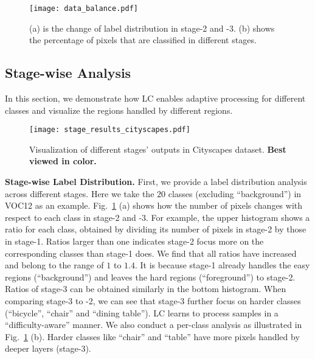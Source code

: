 \documentclass[10pt,twocolumn,letterpaper]{article}
\begin{document}
\begin{figure}
    \centering
    \texttt{[image: data\_balance.pdf]}
    \vskip -0.2cm
    \caption{\small{(a) is the change of label distribution in stage-2 and -3. (b) shows the percentage of pixels that are classified in different stages.}}
    \label{fig:data_balance}
    \vspace{-12pt}
\end{figure}

\subsection{Stage-wise Analysis}
\label{subsec:stage_analysis}

In this section, we demonstrate how LC enables adaptive processing for different classes and visualize the regions handled by different regions. 

\begin{figure*}
    \centering
    \texttt{[image: stage\_results\_cityscapes.pdf]}
    \vskip -0.2cm
    \caption{\small{Visualization of different stages' outputs in Cityscapes dataset. \textbf{Best viewed in color.}}}
    \label{fig:stage_results_cityscapes}
\end{figure*}

\noindent
\textbf{Stage-wise Label Distribution.}
First, we provide a label distribution analysis across different stages. 
Here we take the $20$ classes (excluding ``background'') in VOC12 as an example.
Fig.~\ref{fig:data_balance} (a) shows how the number of pixels changes with respect to each class in stage-2 and -3. For example, the upper histogram shows a ratio for each class, obtained by dividing its number of pixels in stage-2 by those in stage-1. Ratios larger than one indicates stage-2 focus more on the corresponding classes than stage-1 does. 
We find that all ratios have increased and belong to the range of $1$ to $1.4$.
It is because stage-1 already handles the easy regions (\ie ``background'') and leaves the hard regions (\ie ``foreground'') to stage-2.
Ratios of stage-3 can be obtained similarly in the bottom histogram. When comparing stage-3 to -2, we can see that stage-3 further focus on harder classes (\eg ``bicycle'', ``chair'' and ``dining table'').
LC learns to process samples in a ``difficulty-aware'' manner.
We also conduct a per-class analysis as illustrated in Fig.~\ref{fig:data_balance} (b).
Harder classes like ``chair'' and ``table'' have more pixels handled by deeper layers (stage-3).
\end{document}
